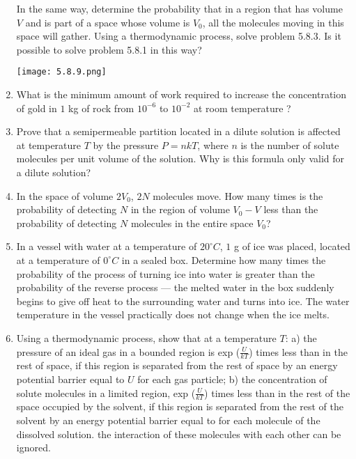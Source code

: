 \documentclass{article}
\begin{document}
\begin{enumerate}[label=5.8.\arabic*]
In the same way, determine the probability that in a region that has volume $V$ and is part of a space whose volume is $V_0$, all the molecules moving in this space will gather. Using a thermodynamic process, solve problem 5.8.3. Is it possible to solve problem 5.8.1 in this way?

\begin{center}
    \texttt{[image: 5.8.9.png]}
\end{center}

\item What is the minimum amount of work required to increase the concentration of gold in $1$ kg of rock from $10^{-6}$ to $10^{-2}$ at room temperature ?

\item Prove that a semipermeable partition located in a dilute solution is affected at temperature $T$ by the pressure $P = nkT$, where $n$ is the number of solute molecules per unit volume of the solution. Why is this formula only valid for a dilute solution?

\item In the space of volume $2V_0$, $2N$ molecules move. How many times is the probability of detecting $N$ in the region of volume $V_0 - V$ less than the probability of detecting $N$ molecules in the entire space $V_0$?

\item In a vessel with water at a temperature of $20^\circ C$, $1$ g of ice was placed, located at a temperature of $0^\circ C$ in a sealed box. Determine how many times the probability of the process of turning ice into water is greater than the probability of the reverse process — the melted water in the box suddenly begins to give off heat to the surrounding water and turns into ice. The water temperature in the vessel practically does not change when the ice melts.

\item Using a thermodynamic process, show that at a temperature $T$: a) the pressure of an ideal gas in a bounded region is exp ($\frac{U}{kT}$) times less than in the rest of space, if this region is separated from the rest of space by an energy potential barrier equal to $U$ for each gas particle; b) the concentration of solute molecules in a limited region, exp ($\frac{U}{kT}$) times less than in the rest of the space occupied by the solvent, if this region is separated from the rest of the solvent by an energy potential barrier equal to for each molecule of the dissolved solution. the interaction of these molecules with each other can be ignored.


\end{enumerate}
\end{document}
